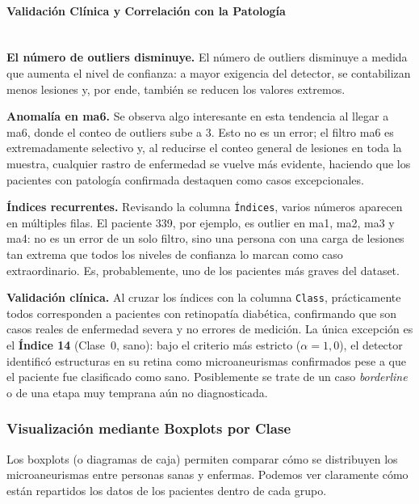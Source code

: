 \paragraph{Validación Clínica y Correlación con la Patología}\mbox{}\\

\textbf{El número de outliers disminuye.}
El número de outliers disminuye a medida que aumenta el nivel de confianza: a mayor exigencia del detector, se contabilizan menos lesiones y, por ende, también se reducen los valores extremos.

\textbf{Anomalía en ma6.}
Se observa algo interesante en esta tendencia al llegar a ma6, donde el conteo de outliers sube a 3. Esto no es un error; el filtro ma6 es extremadamente selectivo y, al reducirse el conteo general de lesiones en toda la muestra, cualquier rastro de enfermedad se vuelve más evidente, haciendo que los pacientes con patología confirmada destaquen como casos excepcionales.

\textbf{Índices recurrentes.}
Revisando la columna \texttt{Índices}, varios números aparecen en múltiples filas. El paciente 339, por ejemplo, es outlier en ma1, ma2, ma3 y ma4: no es un error de un solo filtro, sino una persona con una carga de lesiones tan extrema que todos los niveles de confianza lo marcan como caso extraordinario. Es, probablemente, uno de los pacientes más graves del dataset.

\textbf{Validación clínica.}
Al cruzar los índices con la columna \texttt{Class}, prácticamente todos corresponden a pacientes con retinopatía diabética, confirmando que son casos reales de enfermedad severa y no errores de medición. La única excepción es el \textbf{Índice 14} (Clase~0, sano): bajo el criterio más estricto ($\alpha = 1{,}0$), el detector identificó estructuras en su retina como microaneurismas confirmados pese a que el paciente fue clasificado como sano. Posiblemente se trate de un caso \textit{borderline} o de una etapa muy temprana aún no diagnosticada.

\subsubsection{Visualización mediante Boxplots por Clase}

Los boxplots (o diagramas de caja) permiten comparar cómo se distribuyen los microaneurismas entre personas sanas y enfermas. Podemos ver claramente cómo están repartidos los datos de los pacientes dentro de cada grupo.

